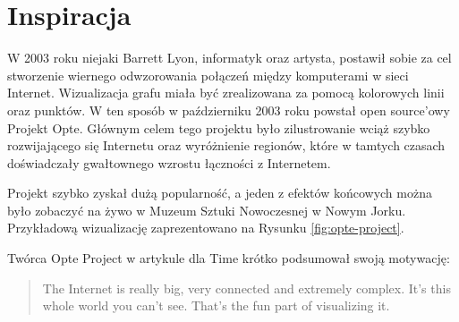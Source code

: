 \section{Inspiracja}
W 2003 roku niejaki Barrett Lyon, informatyk oraz artysta, postawił sobie za cel stworzenie wiernego odwzorowania połączeń między komputerami w sieci Internet. Wizualizacja grafu miała być zrealizowana za pomocą kolorowych linii oraz punktów. W ten sposób w październiku 2003 roku powstał open source'owy Projekt Opte. Głównym celem tego projektu było zilustrowanie wciąż szybko rozwijającego się Internetu oraz wyróżnienie regionów, które w tamtych czasach doświadczały gwałtownego wzrostu łączności z Internetem.

Projekt szybko zyskał dużą popularność, a jeden z efektów końcowych można było zobaczyć na żywo w Muzeum Sztuki Nowoczesnej w Nowym Jorku. Przykładową wizualizację zaprezentowano na Rysunku \ref{fig:opte-project}.

Twórca Opte Project w artykule dla Time \cite{OpteProject:Time} krótko podsumował swoją motywację:

\begin{center}
	\hyphenblockcquote{USenglish}{OpteProject:Time}{
		The Internet is really big, very connected and extremely complex. \linebreak
		It’s this whole world you can’t see. That’s the fun part of visualizing it.
	}
\end{center}

